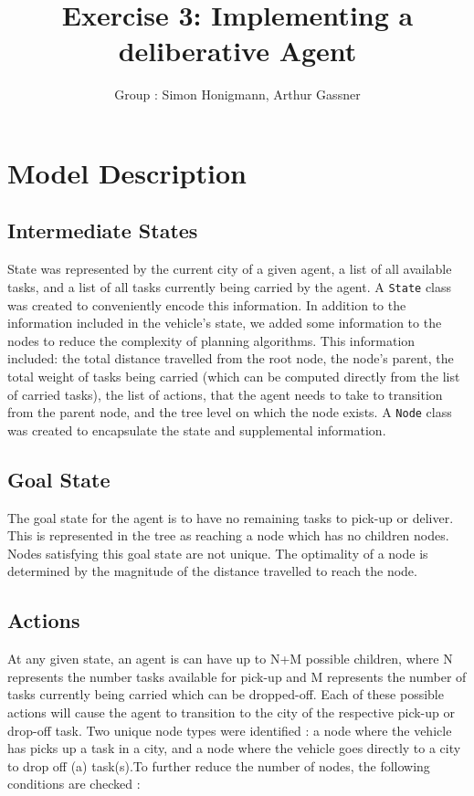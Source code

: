 \documentclass[11pt]{article}
\title{\bf Exercise 3: Implementing a deliberative Agent}
\author{Group \textnumero76: Simon Honigmann, Arthur Gassner}
\begin{document}
\maketitle

\section{Model Description}

\subsection{Intermediate States}
State was represented by the current city of a given agent, a list of all available tasks, and a list of all tasks currently being carried by the agent. A \texttt{State} class was created to conveniently encode this information. In addition to the information included in the vehicle's state, we added some information to the nodes to reduce the complexity of planning algorithms. This information included: the total distance travelled from the root node, the node's parent, the total weight of tasks being carried (which can be computed directly from the list of carried tasks), the list of actions, that the agent needs to take to transition from the parent node, and the tree level on which the node exists. A \texttt{Node} class was created to encapsulate the state and supplemental information. 
\subsection{Goal State}
The goal state for the agent is to have no remaining tasks to pick-up or deliver. This is represented in the tree as reaching a node which has no children nodes. Nodes satisfying this goal state are not unique. The optimality of a node is determined by the magnitude of the distance travelled to reach the node. 

\subsection{Actions}
At any given state, an agent is can have up to N+M possible children, where N represents the number tasks available for pick-up and M represents the number of tasks currently being carried which can be dropped-off. Each of these possible actions will cause the agent to transition to the city of the respective pick-up or drop-off task. Two unique node types were identified : a node where the vehicle has picks up a task in a city, and a node where the vehicle goes directly to a city to drop off (a) task(s).To further reduce the number of nodes, the following conditions are checked :
\end{document}
